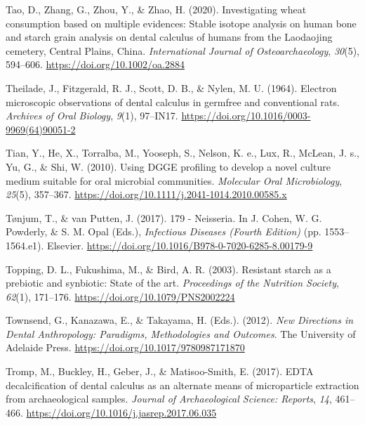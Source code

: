 \documentclass[
  letterpaper,
]{book}
\newlength{\cslhangindent}
\newlength{\cslentryspacingunit} %
\newenvironment{CSLReferences}[2] %
 {%
  \setlength{\parindent}{0pt}
  \ifodd #1
  \let\oldpar\par
  \def\par{\hangindent=\cslhangindent\oldpar}
  \fi
  \setlength{\parskip}{#2\cslentryspacingunit}
 }%
 {}
\begin{document}
\begin{CSLReferences}{1}{0}
\leavevmode{}%
Tao, D., Zhang, G., Zhou, Y., \& Zhao, H. (2020). Investigating wheat
consumption based on multiple evidences: {Stable} isotope analysis on
human bone and starch grain analysis on dental calculus of humans from
the {Laodaojing} cemetery, {Central Plains}, {China}.
\emph{International Journal of Osteoarchaeology}, \emph{30}(5),
594--606. \url{https://doi.org/10.1002/oa.2884}

\leavevmode{}%
Theilade, J., Fitzgerald, R. J., Scott, D. B., \& Nylen, M. U. (1964).
Electron microscopic observations of dental calculus in germfree and
conventional rats. \emph{Archives of Oral Biology}, \emph{9}(1),
97--IN17. \url{https://doi.org/10.1016/0003-9969(64)90051-2}

\leavevmode{}%
Tian, Y., He, X., Torralba, M., Yooseph, S., Nelson, K. e., Lux, R.,
McLean, J. s., Yu, G., \& Shi, W. (2010). Using {DGGE} profiling to
develop a novel culture medium suitable for oral microbial communities.
\emph{Molecular Oral Microbiology}, \emph{25}(5), 357--367.
\url{https://doi.org/10.1111/j.2041-1014.2010.00585.x}

\leavevmode{}%
Tønjum, T., \& van Putten, J. (2017). 179 - {Neisseria}. In J. Cohen, W.
G. Powderly, \& S. M. Opal (Eds.), \emph{Infectious {Diseases} ({Fourth
Edition})} (pp. 1553--1564.e1). {Elsevier}.
\url{https://doi.org/10.1016/B978-0-7020-6285-8.00179-9}

\leavevmode{}%
Topping, D. L., Fukushima, M., \& Bird, A. R. (2003). Resistant starch
as a prebiotic and synbiotic: State of the art. \emph{Proceedings of the
Nutrition Society}, \emph{62}(1), 171--176.
\url{https://doi.org/10.1079/PNS2002224}

\leavevmode{}%
Townsend, G., Kanazawa, E., \& Takayama, H. (Eds.). (2012). \emph{New
{Directions} in {Dental Anthropology}: {Paradigms}, {Methodologies} and
{Outcomes}}. {The University of Adelaide Press}.
\url{https://doi.org/10.1017/9780987171870}

\leavevmode{}%
Tromp, M., Buckley, H., Geber, J., \& Matisoo-Smith, E. (2017). {EDTA}
decalcification of dental calculus as an alternate means of
microparticle extraction from archaeological samples. \emph{Journal of
Archaeological Science: Reports}, \emph{14}, 461--466.
\url{https://doi.org/10.1016/j.jasrep.2017.06.035}


\end{CSLReferences}
\end{document}
